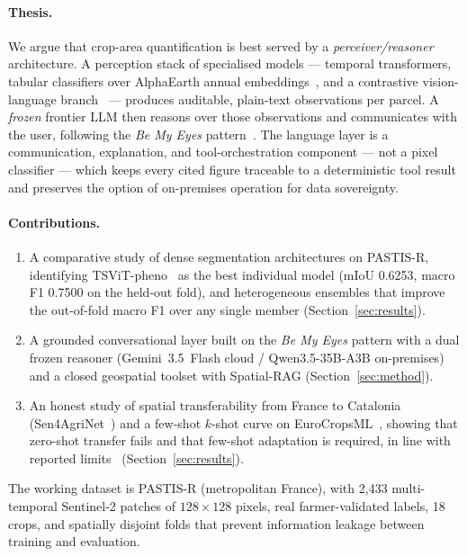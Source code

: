 \paragraph{Thesis.}
We argue that crop-area quantification is best served by a
\emph{perceiver/reasoner} architecture. A perception stack of
specialised models --- temporal transformers, tabular classifiers over
AlphaEarth annual embeddings~\cite{brown2025alphaearth}, and a
contrastive vision-language branch~\cite{li2025farslip} --- produces
auditable, plain-text observations per parcel. A \emph{frozen} frontier
LLM then reasons over those observations and communicates with the
user, following the \emph{Be My Eyes}
pattern~\cite{huang2025bemyeyes}. The language layer is a
communication, explanation, and tool-orchestration component --- not a
pixel classifier --- which keeps every cited figure traceable to a
deterministic tool result and preserves the option of on-premises
operation for data sovereignty.

\paragraph{Contributions.}
\begin{enumerate}[leftmargin=*]
    \item A comparative study of dense segmentation architectures on
    PASTIS-R, identifying TSViT-pheno~\cite{tarasiou2023tsvit} as the
    best individual model (mIoU 0.6253, macro F1 0.7500 on the
    held-out fold), and heterogeneous ensembles that improve the
    out-of-fold macro F1 over any single member
    (Section~\ref{sec:results}).
    \item A grounded conversational layer built on the \emph{Be My
    Eyes} pattern with a dual frozen reasoner (Gemini~3.5~Flash cloud /
    Qwen3.5-35B-A3B on-premises) and a closed geospatial toolset with
    Spatial-RAG (Section~\ref{sec:method}).
    \item An honest study of spatial transferability from France to
    Catalonia (Sen4AgriNet~\cite{sykas2022sen4agrinet}) and a few-shot
    $k$-shot curve on EuroCropsML~\cite{reuss2025eurocropsml},
    showing that zero-shot transfer fails and that few-shot adaptation
    is required, in line with reported
    limits~\cite{harvesting2026alphaearth}
    (Section~\ref{sec:results}).
\end{enumerate}

The working dataset is PASTIS-R (metropolitan France), with 2{,}433
multi-temporal Sentinel-2 patches of $128\times128$ pixels, real
farmer-validated labels, 18 crops, and spatially disjoint folds that
prevent information leakage between training and evaluation.
